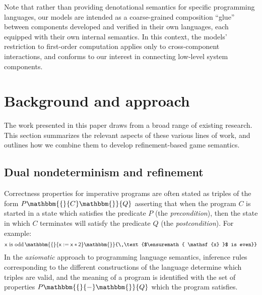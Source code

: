 \documentclass[sigplan,screen]{acmart}
\newcommand{\kw}[1]{\ensuremath{ \mathsf{#1} }}
\newcommand{\htr}[3]{{ {#1} \mathbbm{\{} {#2} \mathbbm{\}} {#3} }}
\begin{document}
Note that rather than providing
denotational semantics for specific programming
languages, our models are intended as a coarse-grained composition
``glue'' between components developed and verified in their own
languages, each equipped with their own internal semantics.
In this context,
the models' restriction to first-order computation
applies only to cross-component interactions,
and conforms to our interest in connecting
low-level system components.




\section{Background and approach} \label{sec:background} %


The work presented in this paper
draws from a broad range of existing research.
This section summarizes the relevant aspects
of these various lines of work,
and outlines how we combine them
to develop
refinement-based game semantics.


\subsection{Dual nondeterminism and refinement} \label{sec:refcal} %


Correctness properties for imperative programs
are often stated as triples of the form $\htr{P}{C}{Q}$
asserting that
when the program $C$ is started in a state which
satisfies the predicate $P$ (the \emph{precondition}),
then the state in which $C$ terminates
will satisfy the predicate $Q$ (the \emph{postcondition}).
For example:
\[
    \htr{\text{$\kw{x}$ is odd}\,}{\kw{x := x * 2}}{\,\text{$\kw{x}$ is even}}
\]
In the \emph{axiomatic} approach to programming language semantics,
inference rules
corresponding to the different constructions of the language
determine which triples are valid,
and the meaning of a program is identified with
the set of properties $\htr{P}{-}{Q}$
which the program satisfies.
\end{document}
